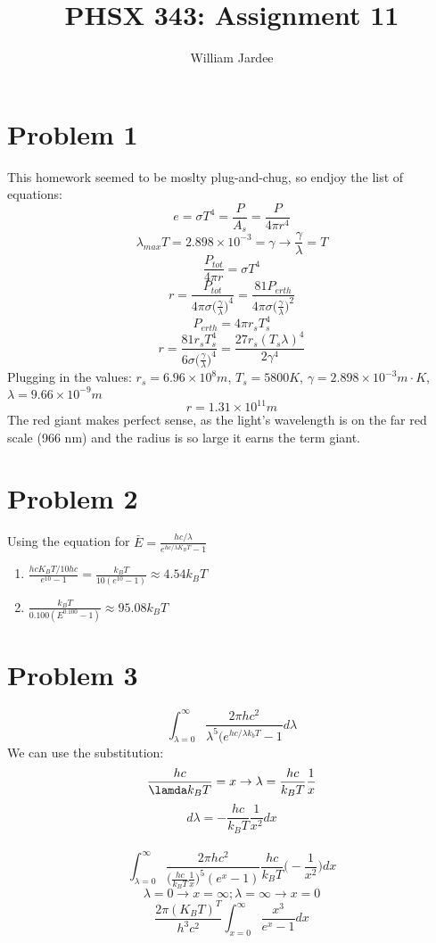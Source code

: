 \documentclass[11pt]{article}
\begin{document}
\date{}

\title{PHSX 343: Assignment 11}

\author{William Jardee}

\maketitle


\section*{Problem 1}
    This homework seemed to be moslty plug-and-chug, so endjoy the list of equations:
    \[e = \sigma T^4 = \frac{P}{A_s} = \frac{P}{4 \pi r^4}\]
    \[\lambda _{max} T = 2.898 \times 10^{-3} = \gamma \rightarrow \frac{\gamma}{\lambda} = T\]
    \[\frac{P_{tot}}{4 \pi r} = \sigma T^4\]
    \[r = \frac{P_{tot}}{4 \pi \sigma \Big(\frac{\gamma}{\lambda}\Big)^4} = \frac{81P_{erth}}{4 \pi \sigma \Big(\frac{\gamma}{\lambda}\Big)^2}\]
    \[P_{erth} = 4 \pi r_s T_s^4\]
    \[r = \frac{81 r_s T_s^4}{6\sigma \Big(\frac{\gamma}{\lambda}\Big)^4} = \frac{27r_s (T_s \lambda)^4}{2 \gamma ^4}\]
    Plugging in the values: $r_s = 6.96 \times 10^8 m$, $T_s = 5800 K$, $\gamma =  2.898 \times 10^{-3} m \cdot K$, $\lambda = 9.66 \times 10^{-9} m$
    \[\boxed{r = 1.31 \times 10^{11} m}\]
    The red giant makes perfect sense, as the light's wavelength is on the far red scale (966 nm) and the radius is so large it earns the term giant. 

\section*{Problem 2}
    Using the equation for $\bar{E} = \frac{hc/ \lambda }{e^{hc/ \lambda K_B T}-1}$

    \begin{enumerate}[label=\alph*)]
    \item $\frac{hcK_B T / 10hc}{e^{10}-1} = \frac{k_B T}{10(e^{10}-1)} \approx 4.54 k_B T$
    
    \item $\frac{k_B T}{0.100(E^{0.100} -1)} \approx 95.08 k_B T$
    \end{enumerate}
    
\section*{Problem 3}
    \[\int_{\lambda = 0}^\infty \frac{2\pi hc^2}{\lambda^5 (e^{hc/\lambda k_b T}-1}d\lambda\]
    We can use the substitution:
    \[\frac{hc}{\lamda k_B T} = x \rightarrow \lambda = \frac{hc}{k_B T}\frac{1}{x}\]
    \[d\lambda = -\frac{hc}{k_B T}\frac{1}{x^2}dx\]\\
    
    \[\int_{\lambda = 0}^\infty \frac{2 \pi hc^2}{\Big(\frac{hc}{k_B T}\frac{1}{x}\Big)^5(e^x -1)}\frac{hc}{k_B T}\Big(-\frac{1}{x^2}\Big)dx\]
    \[\lambda = 0 \rightarrow x = \infty; \lambda = \infty \rightarrow x=0\]
    \[\frac{2\pi(K_B T)^T}{h^3 c^2}\int_{x=0}^\infty \frac{x^3}{e^x -1}dx\]
\end{document}
